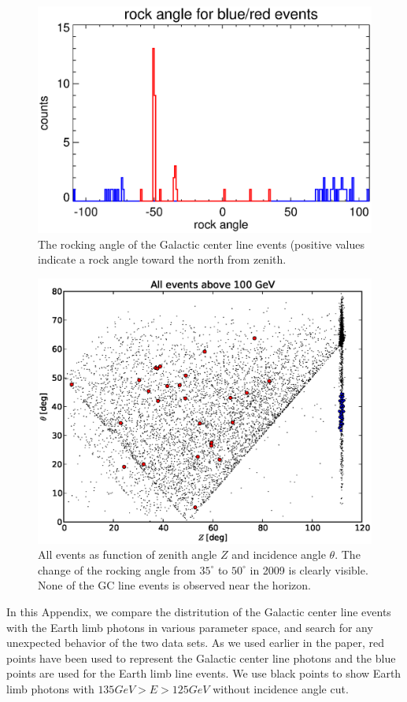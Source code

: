 \documentclass[aps,twocolumn,prd,superscriptaddress,showpacs,nofootinbib,fixfloat]{revtex4}
\begin{document}
\begin{figure}
  \centering
  \includegraphics[width=0.9\linewidth]{plots/rockangle.ps}
  \caption{The rocking angle of the Galactic center line
  events (positive values indicate a rock angle toward the
  north from zenith.}
  \label{fig:rock}
\end{figure}

\begin{figure}
  \centering
  \includegraphics[width=0.9\linewidth]{plots/theta_z.eps}
  \caption{All events as function of zenith angle $Z$ and incidence angle
  $\theta$. The change of the rocking angle from $35^\circ$ to $50^\circ$ in
  2009 is clearly visible. None of the GC line events is observed near the
  horizon.}
  \label{fig:theta_z}
\end{figure}

In this Appendix, we compare the distritution of the
Galactic center line events with the Earth limb photons in
various parameter space, and search for any unexpected
behavior of the two data sets. As we used earlier in the
paper, red points have been used to represent the Galactic
center line photons and the blue points are used for the
Earth limb line events. We use black points to show Earth limb
photons with $135 GeV > E > 125 GeV$ without incidence angle cut.
\end{document}
